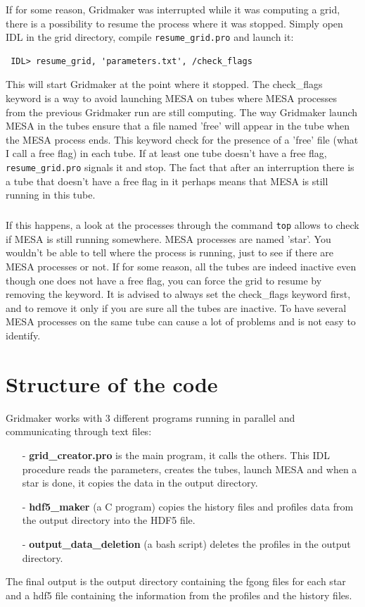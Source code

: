 \documentclass{report}
\begin{document}
If for some reason, Gridmaker was interrupted while it was computing a grid, there is a possibility to resume the process where it was stopped. Simply
open IDL in the grid directory, compile \verb+resume_grid.pro+ and launch it:

\begin{verbatim} IDL> resume_grid, 'parameters.txt', /check_flags
\end{verbatim}

This will start Gridmaker at the point where it stopped. The check\_flags keyword is a way to avoid launching MESA on tubes where MESA processes from
the previous Gridmaker run are still computing. The way Gridmaker launch MESA in the tubes ensure that a file named 'free' will appear in the tube when the MESA process ends. This keyword check for the presence of a 'free' file (what I call a free flag) in each tube. If at least one tube doesn't have a free flag, \verb+resume_grid.pro+ signals it and stop. The fact that after an interruption there is a tube that doesn't have a free flag in it perhaps means that MESA is still running in this tube. 

\paragraph{}If this happens, a look at the processes through the command \verb+top+ allows to check if MESA is still running somewhere. MESA processes are named 'star'. You wouldn't be able to tell where the process is running, just to see if there are MESA processes or not. If for some reason, all the tubes are indeed inactive even though one does not have a free flag, you can force the grid to resume by removing the keyword. It is advised to always set the check\_flags keyword first, and to remove it only if you are sure all the tubes are inactive. To have several MESA processes on the same tube can cause a lot of problems and is not easy to identify.


\chapter{Structure of the code}

Gridmaker works with 3 different programs running in parallel and communicating through text files:
\begin{itemize}
\item[-]{\textbf{grid\_creator.pro}} is the main program, it calls the others. This IDL procedure reads the parameters, creates the tubes, launch
MESA and when a star is done, it copies the data in the output directory.
\item[-]{\textbf{hdf5\_maker}} (a C program) copies the history files and profiles data from the output directory into the HDF5 file.
\item[-]{\textbf{output\_data\_deletion}} (a bash script) deletes the profiles in the output directory. 
\end{itemize}
The final output is the output directory containing the fgong files for each star and a hdf5 file containing the information from the profiles and 
the history files.
\end{document}

